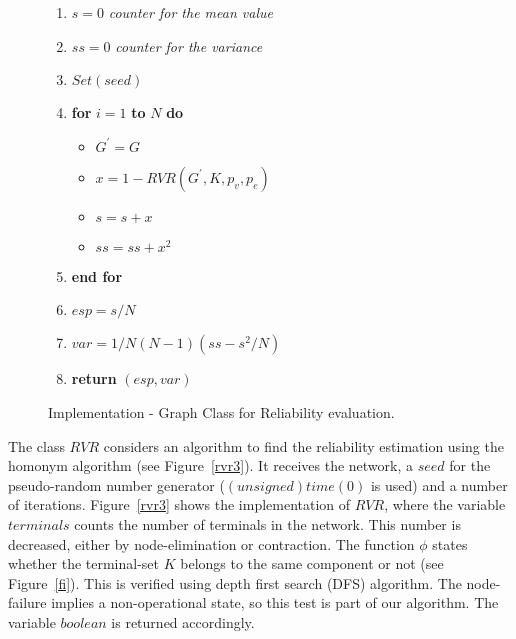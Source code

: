 \begin{figure}[H]
\begin{algorithm}[H]
\caption{$R = Rel(G,seed,N,K,p_v,p_e)$}
\begin{enumerate}
\item $s=0$ \textit{counter for the mean value}
\item $ss=0$  \textit{counter for the variance}
\item $Set(seed)$
\item \textbf{for} $i=1$ \textbf{to} $N$ \textbf{do}
\begin{itemize}
\item $G^{\prime}=G$
\item $x = 1-RVR(G^{\prime},K,p_v,p_e)$
\item $s = s+x$
\item $ss = ss + x^2$
\end{itemize}
\item \textbf{end for}
\item $esp = s/N$
\item $var = 1/N(N-1) (ss-s^2/N)$
\item \textbf{return} $(esp,var)$
\end{enumerate}
\end{algorithm}
\caption{Implementation - Graph Class for Reliability evaluation. \label{rvr2}}
\end{figure}

The class $RVR$ considers an algorithm to find the reliability estimation using the homonym 
algorithm (see Figure~\ref{rvr3}). It receives the network, a $seed$ for the pseudo-random number 
generator ($(unsigned)time(0)$ is used) and a number of iterations. 
Figure~\ref{rvr3} shows the implementation of $RVR$, where the variable $terminals$ counts the number of 
terminals in the network. This number is decreased, either by node-elimination or contraction. The function 
$\phi$ states whether the terminal-set $K$ belongs to the same component or not (see Figure~\ref{fi}). 
This is verified using  depth first  search (DFS) algorithm. The node-failure implies a non-operational state, so this test is part of our algorithm. The variable $boolean$ is returned accordingly. 

